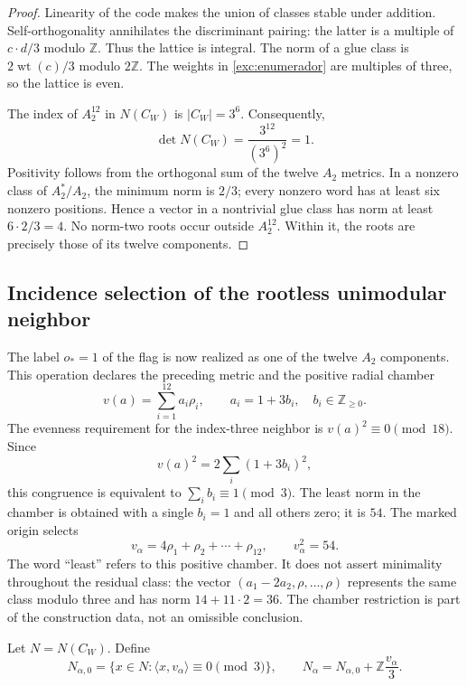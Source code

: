 \begin{proof}
Linearity of the code makes the union of classes stable under
addition. Self-orthogonality annihilates the discriminant pairing:
the latter is a multiple of $c\cdot d/3$ modulo $\mathbb Z$. Thus the
lattice is integral. The norm of a glue class is
$2\operatorname{wt}(c)/3$ modulo $2\mathbb Z$. The weights in
\eqref{exc:enumerador} are multiples of three, so the lattice is even.

The index of $A_2^{12}$ in $N(C_W)$ is $|C_W|=3^6$. Consequently,
\[
 \det N(C_W)=\frac{3^{12}}{(3^6)^2}=1.
\]
Positivity follows from the orthogonal sum of the twelve $A_2$ metrics.
In a nonzero class of $A_2^*/A_2$, the minimum norm is $2/3$;
every nonzero word has at least six nonzero positions.
Hence a vector in a nontrivial glue class has norm
at least $6\cdot2/3=4$. No norm-two roots occur outside
$A_2^{12}$. Within it, the roots are precisely those of its
twelve components.
\end{proof}

\subsection{Incidence selection of the rootless unimodular neighbor}
\label{exc:leech}

The label $o_*=1$ of the flag is now realized as one of the
twelve $A_2$ components. This operation declares the preceding metric and
the positive radial chamber
\[
 v(a)=\sum_{i=1}^{12}a_i\rho_i,
 \qquad a_i=1+3b_i,\quad b_i\in\mathbb Z_{\geq0}.
\]
The evenness requirement for the index-three neighbor is
$v(a)^2\equiv0\pmod{18}$. Since
\[
 v(a)^2=2\sum_i(1+3b_i)^2,
\]
this congruence is equivalent to $\sum_i b_i\equiv1\pmod3$. The least
norm in the chamber is obtained with a single $b_i=1$ and
all others zero; it is $54$. The marked origin selects
\begin{equation}
 v_\alpha=4\rho_1+\rho_2+\cdots+\rho_{12},
 \qquad v_\alpha^2=54.
 \label{exc:vector}
\end{equation}
The word ``least'' refers to this positive chamber. It does not assert
minimality throughout the residual class: the vector
$(a_1-2a_2,\rho,\ldots,\rho)$ represents the same class modulo three
and has norm $14+11\cdot2=36$. The chamber restriction is part
of the construction data, not an omissible conclusion.

Let $N=N(C_W)$. Define
\begin{equation}
 N_{\alpha,0}=\{x\in N:\langle x,v_\alpha\rangle\equiv0\pmod3\},
 \qquad
 N_\alpha=N_{\alpha,0}+\mathbb Z\frac{v_\alpha}{3}.
 \label{exc:vecino}
\end{equation}

